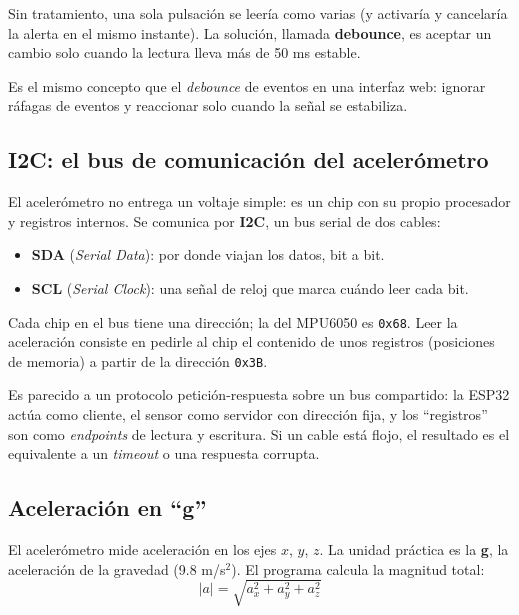 \documentclass[11pt,a4paper]{article}
\begin{document}
Sin tratamiento, una sola pulsación se leería como varias (y activaría y cancelaría la
alerta en el mismo instante). La solución, llamada \textbf{debounce}, es aceptar un cambio
solo cuando la lectura lleva más de 50 ms estable.

\begin{analogia}[debounce]
Es el mismo concepto que el \emph{debounce} de eventos en una interfaz web: ignorar
ráfagas de eventos y reaccionar solo cuando la señal se estabiliza.
\end{analogia}

\subsection{I2C: el bus de comunicación del acelerómetro}

El acelerómetro no entrega un voltaje simple: es un chip con su propio procesador y
registros internos. Se comunica por \textbf{I2C}, un bus serial de dos cables:

\begin{itemize}[leftmargin=*]
  \item \textbf{SDA} (\emph{Serial Data}): por donde viajan los datos, bit a bit.
  \item \textbf{SCL} (\emph{Serial Clock}): una señal de reloj que marca cuándo leer cada bit.
\end{itemize}

Cada chip en el bus tiene una dirección; la del MPU6050 es \texttt{0x68}. Leer la
aceleración consiste en pedirle al chip el contenido de unos registros (posiciones de
memoria) a partir de la dirección \texttt{0x3B}.

\begin{analogia}[I2C]
Es parecido a un protocolo petición-respuesta sobre un bus compartido: la ESP32 actúa
como cliente, el sensor como servidor con dirección fija, y los ``registros'' son como
\emph{endpoints} de lectura y escritura. Si un cable está flojo, el resultado es el
equivalente a un \emph{timeout} o una respuesta corrupta.
\end{analogia}

\subsection{Aceleración en ``g''}

El acelerómetro mide aceleración en los ejes $x$, $y$, $z$. La unidad práctica es la
\textbf{g}, la aceleración de la gravedad (9.8 m/s$^2$). El programa calcula la magnitud
total:
\[
  |a| = \sqrt{a_x^2 + a_y^2 + a_z^2}
\]
\end{document}
